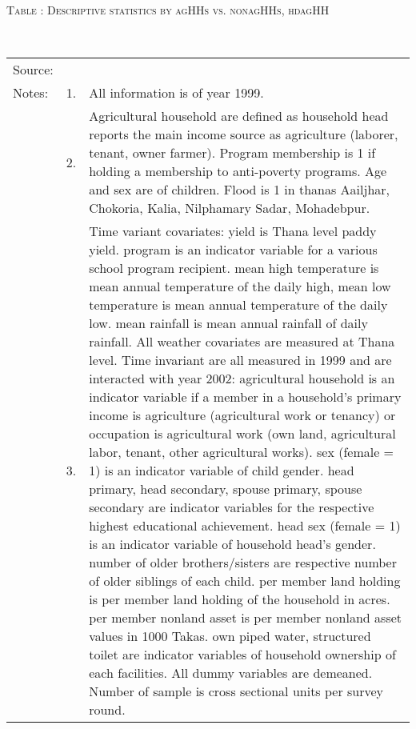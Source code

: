 \begin{minipage}[t]{14cm}
\hfil\textsc{\normalsize Table \thetable: Descriptive statistics by agHHs vs. nonagHHs, hdagHH\label{tab destat zEm1999 by hdagHH}}\\
\setlength{\tabcolsep}{1pt}
\renewcommand{\arraystretch}{.8}
\hfil{}\\
\renewcommand{\arraystretch}{.8}
\setlength{\tabcolsep}{1pt}
\begin{tabular}{>{\hfill\scriptsize}p{1cm}<{}>{\hfill\scriptsize}p{.25cm}<{}>{\scriptsize}p{12cm}<{\hfill}}
Source:& \multicolumn{2}{l}{\scriptsize Compiled from IFPRI data.}\\
Notes: & 1. & All information is of year 1999.\\
& 2. & Agricultural household are defined as household head reports the main income source as agriculture (laborer, tenant, owner farmer). \textsf{Program} membership is 1 if holding a membership to anti-poverty programs. \textsf{Age} and \textsf{sex} are of children. \textsf{Flood} is 1 in thanas Aailjhar,  Chokoria, Kalia, Nilphamary Sadar, Mohadebpur.\\
& 3. & Time variant covariates: \textsf{yield} is Thana level paddy yield. \textsf{program} is an indicator variable for a various school program recipient. \textsf{mean high temperature} is mean annual temperature of the daily high, \textsf{mean low temperature} is mean annual temperature of the daily low. \textsf{mean rainfall} is mean annual rainfall of daily rainfall. All weather covariates are measured at Thana level. Time invariant are all measured in 1999 and are interacted with year 2002: \textsf{agricultural household} is an indicator variable if a member in a household's primary income is agriculture (agricultural work or tenancy) or occupation is agricultural work (own land, agricultural labor, tenant, other agricultural works). \textsf{sex (female = 1)} is an indicator variable of child gender. \textsf{head primary, head secondary, spouse primary, spouse secondary} are indicator variables for the respective highest educational achievement. \textsf{head sex (female = 1)} is an indicator variable of household head's gender. \textsf{number of older brothers/sisters} are respective number of older siblings of each child. \textsf{per member land holding} is per member land holding of the household in acres. \textsf{per member nonland asset} is per member nonland asset values in 1000 Takas. \textsf{own piped water, structured toilet} are indicator variables of household ownership of each facilities. All dummy variables are demeaned. Number of sample is cross sectional units per survey round. 
\end{tabular}
\end{minipage}\\ \vspace{2ex}

